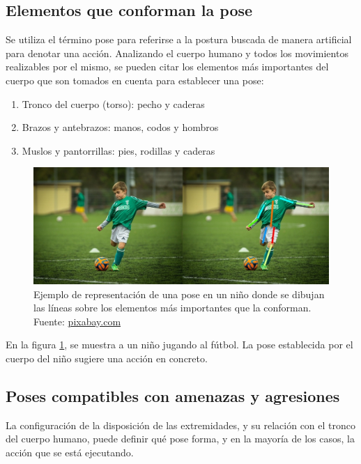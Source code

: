 \documentclass[a4paper,12pt,oneside,spanish]{book}
\begin{document}
\subsection{Elementos que conforman la pose}
Se utiliza el término pose para referirse a la postura buscada de manera artificial para denotar una acción. Analizando el cuerpo humano y todos los movimientos realizables por el mismo, se pueden citar los elementos más importantes del cuerpo que son tomados en cuenta para establecer una pose: 
\begin{enumerate}
	\baselineskip 16pt
	\item Tronco del cuerpo (torso): pecho y caderas  
	\item Brazos y antebrazos: manos, codos y hombros  
	\item Muslos y pantorrillas: pies, rodillas y caderas
\end{enumerate}

\begin{figure}[h!]
	\includegraphics[width=350pt]{Imagenes/pose1.jpg}
	\centering
	\caption{Ejemplo de representación de una pose en un niño donde  se dibujan las líneas sobre los elementos más importantes que la conforman. Fuente: \url{pixabay.com}}
	\label{fig:pose1}
\end{figure}

En la figura \ref{fig:pose1}, se muestra a un niño jugando al fútbol. La pose establecida por el cuerpo del niño sugiere una acción en concreto. \par

\subsection{Poses compatibles con amenazas y agresiones}

La configuración de la disposición de las extremidades, y su relación con el tronco del cuerpo humano, puede definir qué pose forma, y en la mayoría de los casos, la acción que se está ejecutando. \par
\end{document}
